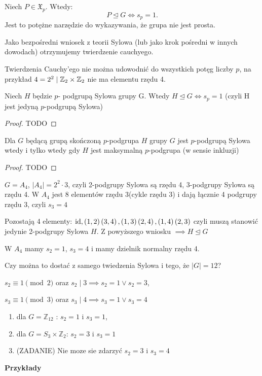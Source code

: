 \begin{corollary}
    Niech $P \in \mathfrak{X}_p$. Wtedy:
    \[ P \unlhd G \iff s_p = 1. \]
    Jest to potężne narzędzie do wykazywania, że grupa nie jest prosta.
\end{corollary}

Jako bezpośredni wniosek z teorii Sylowa (lub jako krok pośredni w innych dowodach) otrzymujemy twierdzenie cauchyego.

\begin{remark}
	Twierdzenia Cauchy'ego nie można udowodnić do wszystkich potęg liczby $p$, na przykład $4=2^2 \mid \mathbb{Z}_2\times \mathbb{Z}_2$ nie ma elementu rzędu 4.
\end{remark}
\begin{theorem}
	Niech $H$ będzie $p $- podgrupą Sylowa grupy G. Wtedy $H\unlhd G \iff s_{p}=1$ (czyli H jest jedyną $p$-podgrupą Sylowa)
\end{theorem} 
\begin{proof}
	TODO
\end{proof} 
\begin{theorem}
	Dla $G$ będącą grupą skończoną $p$-podgrupa $H$ grupy $G$ jest $p$-podgrupą Sylowa wtedy i tylko wtedy gdy $H$ jest maksymalną $p$-podgrupa
	(w sensie inkluzji)
\end{theorem} 
\begin{proof}
	TODO
\end{proof} 
\begin{eg}
	$G=A_4$, $\left| A_4 \right| = 2^2\cdot 3$, czyli 2-podgrupy Sylowa są rzędu 4, 3-podgrupy Sylowa są rzędu 4.
	W $A_4$ jest 8 elementów rzędu 3(cykle rzędu 3) i dają łącznie 4 podgrupy rzędu 3, czyli $s_{3} = 4$

	Pozostają 4 elementy: $\operatorname{id},\left( 1,2 \right)\left( 3,4 \right) , \left( 1,3 \right) \left( 2,4 \right) , \left( 1,4 \right)\left( 2,3 \right) $ 
	czyli muszą stanowić jedynie 2-podgrupy Sylowa $H$. Z powyższego wniosku $\implies H\unlhd G$
\end{eg} 
\begin{remark}	
	W $A_4$ mamy $s_2=1$, $s_3=4$ i mamy dzielnik normalny rzędu 4.
	\begin{question}	
		Czy można to dostać z samego twiedzenia Sylowa i tego, że $\left| G \right| =12$?
	\end{question}
	$s_2 \equiv 1 \pmod{2} $ oraz $s_2\mid 3\implies s_2=1 \lor s_2=3$,

	$s_3 \equiv 1 \pmod{3} $ oraz $s_3\mid 4\implies s_3=1 \lor s_3=4$

	\begin{enumerate}[label=(\roman*)]
		\item dla $G=\mathbb{Z}_{12}$ : $s_2=1$ i $s_3=1$,
		\item dla $G=S_3\times \mathbb{Z}_{2}$: $s_2=3$ i $s_3=1$ 
		\item (ZADANIE) Nie moze sie zdarzyć $s_2=3$ i $s_3=4$
	\end{enumerate}
\end{remark} 
\textbf{Przykłady} 

